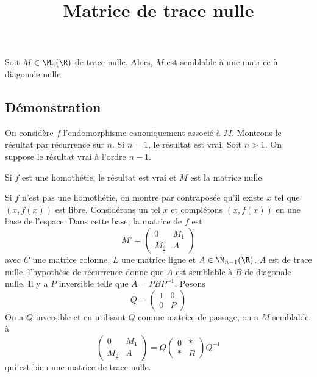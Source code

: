 \documentclass[fontsize=12pt,twoside=false,parskip=half, french]{scrartcl}
\title{Matrice de trace nulle}
\date{}
\author{}
\begin{document}
\maketitle
   \begin{Theoreme}
      Soit $M \in \M_n(\R)$ de trace nulle. Alors, $M$ est semblable à une matrice à diagonale nulle.
   \end{Theoreme}
   \subsection{Démonstration}
      On considère $f$ l’endomorphisme canoniquement associé à $M$.
      Montrons le résultat par récurrence sur $n$. Si $n = 1$, le résultat est vrai.
      Soit $n > 1$. On suppose le résultat vrai à l’ordre $n - 1$.
      
      Si $f$ est une homothétie, le résultat est vrai et $M$ est la matrice nulle.
      
      Si $f$ n’est pas une homothétie, on montre par contraposée qu’il existe $x$ tel que $(x, f(x))$ est libre. 
      Considérons un tel $x$ et complétons $(x, f(x))$ en une base
      de l’espace. Dans cette base, la matrice de $f$ est
      \[
         M’ = 
         \begin{pmatrix}
            0 & M_1\\
            M_2 & A
         \end{pmatrix}
      \]
      avec $C$ une matrice colonne, $L$ une matrice ligne et $A \in \M_{n - 1}(\R)$. $A$ est de trace nulle,
      l’hypothèse de récurrence donne que $A$ est semblable à $B$ de diagonale nulle. Il y a $P$ inversible telle que $A = PBP^{-1}$. Posons
      \[
         Q = 
         \begin{pmatrix}
           1 & 0\\
           0 & P
         \end{pmatrix}
      \]
      On a $Q$ inversible et en utilisant $Q$ comme matrice de passage, on a $M$ semblable à
      \[
         \begin{pmatrix}
            0 & M_1\\
            M_2 & A
         \end{pmatrix} = Q \begin{pmatrix}
         0  & *\\
         * & B
         \end{pmatrix} Q^{-1}        
      \]
      qui est bien une matrice de trace nulle.
\end{document}
